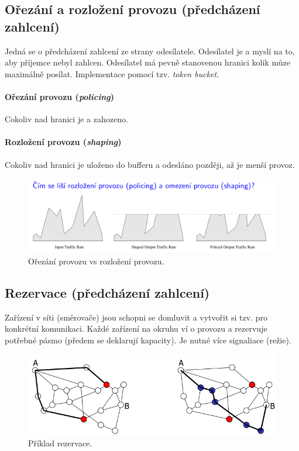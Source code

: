 \subsection{Ořezání a rozložení provozu (předcházení zahlcení)}

Jedná se o předcházení zahlcení ze strany odesílatele. Odesílatel je  a myslí na to, aby příjemce nebyl zahlcen. Odesílatel má pevně stanovenou hranici kolik můze maximálně posílat. Implementace pomocí tzv. \textit{token bucket}.

\paragraph*{Ořezání provozu (\textit{policing})} Cokoliv nad hranici je  a zahozeno.

\paragraph*{Rozložení provozu (\textit{shaping})} Cokoliv nad hranici je uloženo do bufferu a odesláno později, až je menší provoz.

\begin{figure}[H]
    \centering
    \includegraphics[width=1\linewidth]{traffic_policing_and_shaping.png}
    \caption{Ořezání provozu vs rozložení provozu.}
\end{figure}

\subsection{Rezervace (předcházení zahlcení)}

Zařízení v síti (směrovače) jsou schopni se domluvit a vytvořit si tzv.  pro konkrétní komunikaci. Každé zařízení na okruhu ví o provozu a rezervuje potřebné pásmo (předem se deklarují kapacity). Je nutné více signaliace (režie).

\begin{figure}[H]
    \centering
    \includegraphics[width=1\linewidth]{rezervace.png}
    \caption{Příklad rezervace.}
\end{figure}

